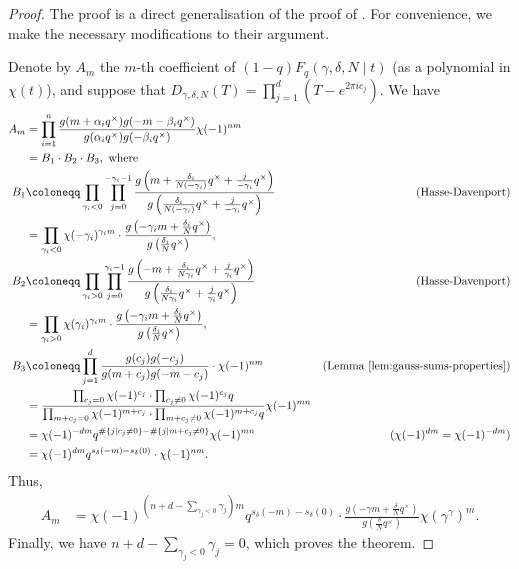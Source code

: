 \documentclass[11pt, reqno]{amsart}
\theoremstyle{plain}
\theoremstyle{definition}
\newcommand{\ga}{\gamma}
\newcommand{\be}{\beta}
\newcommand{\al}{\alpha}
\begin{document}
\begin{proof}
The proof is a direct generalisation of the proof of \cite[Theorem 1.3]{BCM}. For convenience, we make the necessary modifications to their argument.

Denote by $A_m$ the $m$-th coefficient of $(1-q)F_q\left(\gamma, \delta,N \mid t\right) $ (as a polynomial in $\chi(t)$), and suppose that $D_{\ga,\delta,N}(T) = \prod_{j=1}^d (T- e^{2 \pi i c_j})$. We have
\begingroup
\allowdisplaybreaks
\begin{align*}
    A_m &=\prod_{i=1}^n \frac{g(m+ \al_i q^\times)g(-m- \be_i q^\times)}{g(\al_i q^\times)g(-\be_i q^\times)} \chi(-1)^{nm}\\
    &=B_1 \cdot B_2 \cdot B_3, \text{ where } \\
    B_1 &\coloneqq \prod_{\gamma_i<0} \prod_{j=0}^{-\gamma_i-1} \frac{g\left(m+ \frac{\delta_i }{N(-\gamma_i)}q^\times +\frac{j}{-\gamma_i} q^\times\right)}{g\left( \frac{\delta_i }{N(-\gamma_i)}q^\times +\frac{j}{-\gamma_i} q^\times\right)} &\text {(Hasse-Davenport)}\\
    &= \prod_{\gamma_i< 0}\chi(-\gamma_i)^{\gamma_i m} \cdot \frac{g\left(-\gamma_i m + \frac{\delta_i}{N}q^\times\right)}{g\left(\frac{\delta_i}{N}q^\times\right)}, \\
    B_2 &\coloneqq \prod_{\gamma_i>0} 
    \prod_{j=0}^{\gamma_i-1} 
    \frac{g\left(-m+ \frac{\delta_i }{N\gamma_i}q^\times +\frac{j}{\gamma_i} q^\times\right)}{g\left(\frac{\delta_i }{N\gamma_i}q^\times +\frac{j}{\gamma_i} q^\times\right)} &\text {(Hasse-Davenport)}\\
    &=\prod_{\gamma_i >0 } \chi(\gamma_i)^{\gamma_im} \cdot \frac{g\left(-\gamma_i m + \frac{\delta_i}{N}q^\times\right)}{g\left(\frac{\delta_i}{N}q^\times\right)},\\
    B_3 &\coloneqq \prod_{j=1}^d \frac{g(c_j)g(-c_j)}{g(m+c_j)g(-m-c_j)}\cdot \chi(-1)^{nm}  &\text{(Lemma \ref{lem:gauss-sums-properties})}\\
    &= \frac{ \prod_{c_j =0} \chi(-1)^{c_j} \cdot \prod_{c_j \neq 0} \chi(-1)^{c_j}q } {\prod_{m+c_j =0} \chi(-1)^{m+c_j} \cdot \prod_{m+c_j \neq 0} \chi(-1)^{m+c_j}q} \chi(-1)^{mn}\\
    &= \chi(-1)^{-dm} q^{\#\{j \mid c_j \neq 0 \}-\#\{j \mid m+c_j \neq 0 \} }\chi(-1)^{mn} & (\chi(-1)^{dm} = \chi(-1)^{-dm})\\
    &= \chi(-1)^{dm} q^{s_\delta(-m)-s_\delta(0)}\cdot \chi(-1)^{nm}.
\end{align*}
\endgroup
Thus,
\begin{align*}
   A_m &= \chi(-1)^{\left(n+d -\sum_{\ga_j<0} \ga_j \right)m}  q^{s_\delta(-m)-s_\delta(0)}\cdot \frac{g\left(-\gamma m +\frac{\delta}{N} q^\times\right)} {g\left(\frac{\delta}{N} q^\times\right)}\chi(\gamma^{\gamma})^m.
\end{align*}
Finally, we have $n+d -\sum_{\ga_j<0} \ga_j=0$, which proves the theorem.
\end{proof}
\end{document}
